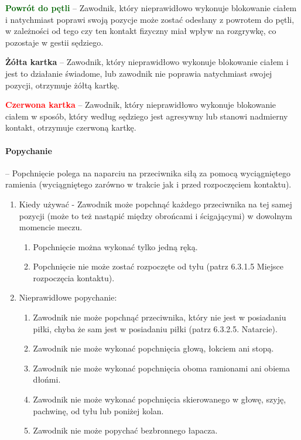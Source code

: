 \documentclass[12pt]{article}
\newcommand\redcard[1]{\bgroup\textcolor{red}{\textbf{#1}}}
\newcommand\yellowcard[1]{\bgroup\textcolor{darkyellow}{\textbf{#1}}}
\newcommand\other[1]{\bgroup\textcolor{darkgreen}{\textbf{#1}}}
\begin{document}
\other{Powrót do pętli} -- Zawodnik, który nieprawidłowo wykonuje
blokowanie ciałem i natychmiast poprawi swoją pozycje może zostać
odesłany z powrotem do pętli, w zależności od tego czy ten kontakt
fizyczny miał wpływ na rozgrywkę, co pozostaje w gestii sędziego.

\yellowcard{Żółta kartka} -- Zawodnik, który nieprawidłowo wykonuje blokowanie
ciałem i jest to działanie świadome, lub zawodnik nie poprawia
natychmiast swojej pozycji, otrzymuje żółtą kartkę.

\redcard{Czerwona kartka} -- Zawodnik, który nieprawidłowo wykonuje
blokowanie ciałem w sposób, który według sędziego jest agresywny lub
stanowi nadmierny kontakt, otrzymuje czerwoną kartkę.

\paragraph{Popychanie} -- Popchnięcie polega na naparciu na
przeciwnika siłą za pomocą wyciągniętego ramienia (wyciągniętego zarówno
w trakcie jak i przed rozpoczęciem kontaktu).

\begin{enumerate}
	\item
	      Kiedy używać - Zawodnik może popchnąć każdego przeciwnika na tej samej
	      pozycji (może to też nastąpić między obrońcami i ścigającymi) w
	      dowolnym momencie meczu.

	      \begin{enumerate}
		      \item
		            Popchnięcie można wykonać tylko jedną ręką.
		      \item
		            Popchnięcie nie może zostać rozpoczęte od tyłu (patrz 6.3.1.5
		            Miejsce rozpoczęcia kontaktu).
	      \end{enumerate}
	\item
	      Nieprawidłowe popychanie:

	      \begin{enumerate}
		      \item
		            Zawodnik nie może popchnąć przeciwnika, który nie jest w posiadaniu
		            piłki, chyba że sam jest w posiadaniu piłki (patrz 6.3.2.5.
		            Natarcie).
		      \item
		            Zawodnik nie może wykonać popchnięcia głową, łokciem ani stopą.
		      \item
		            Zawodnik nie może wykonać popchnięcia oboma ramionami ani obiema
		            dłońmi.
		      \item
		            Zawodnik nie może wykonać popchnięcia skierowanego w głowę, szyję,
		            pachwinę, od tyłu lub poniżej kolan.
		      \item
		            Zawodnik nie może popychać bezbronnego łapacza.
	      \end{enumerate}
\end{enumerate}
\end{document}
